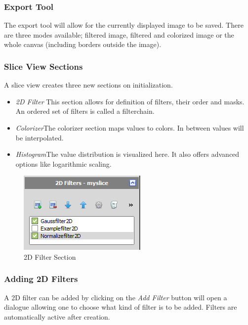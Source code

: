 \subsubsection{Export Tool}

The export tool will allow for the currently displayed image to be saved. There are three modes available; filtered image, filtered and colorized image or the whole canvas (including borders outside the image).

\subsubsection{Slice View Sections}

A slice view creates three new sections on initialization.

\begin{itemize}
	\item{\emph{2D Filter }\newline This section allows for definition of filters, their order and masks. An ordered set of filters is called a filterchain.}
	\item{\emph{Colorizer}\newline The colorizer section maps values to colors. In between values will be interpolated.}	
	\item{\emph{Histogram}\newline The value distribution is visualized here. It also offers advanced options like logarithmic scaling.}

\end{itemize}

\begin{figure}[h]
	\caption{2D Filter Section}
	\centering
	\includegraphics[scale=1.0]{img/2d/2dfilter.png}
\end{figure}

\subsubsection{Adding 2D Filters}

A 2D filter can be added by clicking on the \emph{Add Filter} button will open a dialogue allowing one to choose what kind of filter is to be added. Filters are automatically active after creation.

